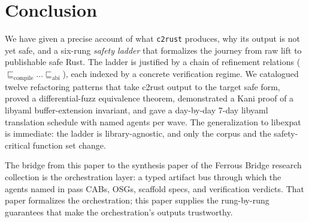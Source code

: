 \documentclass[12pt]{article}
\theoremstyle{definition}
\theoremstyle{remark}
\begin{document}
\section{Conclusion}
\label{sec:conclusion}

We have given a precise account of what \texttt{c2rust} produces, why
its output is not yet safe, and a six-rung \emph{safety ladder} that
formalizes the journey from raw lift to publishable safe Rust. The
ladder is justified by a chain of refinement relations
($\sqsubseteq_{\mathrm{compile}} \dots \sqsubseteq_{\mathrm{abi}}$),
each indexed by a concrete verification regime. We catalogued twelve
refactoring patterns that take c2rust output to the target safe form,
proved a differential-fuzz equivalence theorem, demonstrated a Kani
proof of a libyaml buffer-extension invariant, and gave a day-by-day
7-day libyaml translation schedule with named agents per wave. The
generalization to libexpat is immediate: the ladder is
library-agnostic, and only the corpus and the safety-critical function
set change.

The bridge from this paper to the synthesis paper of the Ferrous
Bridge research collection is the orchestration layer: a typed
artifact bus through which the agents named in
 pass CABs, OSGs, scaffold specs, and verification
verdicts. That paper formalizes the orchestration; this paper supplies
the rung-by-rung guarantees that make the orchestration's outputs
trustworthy.
\end{document}
